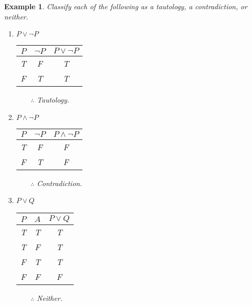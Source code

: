 \documentclass[12pt,a4paper]{article}
\newtheorem{eg}{Example}[subsection]
\begin{document}
\begin{eg}
	Classify each of the following as a tautology, a contradiction, or neither.
	\begin{enumerate}
		\item $P\vee\neg P$
		\begin{center}\begin{tabular}{c|c|c}
			$P$&$\neg P$&$P\vee\neg P$\\
			\hline
			T&F&T\\
			F&T&T
		\end{tabular}$\qquad\therefore$ Tautology.\end{center}
		\item $P\wedge\neg P$
		\begin{center}\begin{tabular}{c|c|c}
			$P$&$\neg P$&$P\wedge\neg P$\\
			\hline
			T&F&F\\
			F&T&F
		\end{tabular}$\qquad\therefore$ Contradiction.\end{center}
		\item $P\vee Q$
		\begin{center}\begin{tabular}{c|c|c}
			$P$&$A$&$P\vee Q$\\
			\hline
			T&T&T\\
			T&F&T\\
			F&T&T\\
			F&F&F
		\end{tabular}$\qquad\therefore$ Neither.\end{center}
	\end{enumerate} 	
\end{eg}
\end{document}
